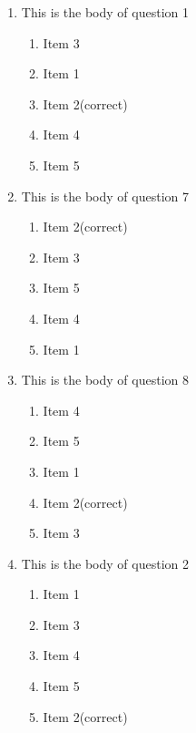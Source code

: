 \documentclass[amsfonts,bezier,leqno,fleqn,12pt,a4paper]{article}
\begin{document}
{\begin{large}
\begin{enumerate}
\begin{enumerate}
\end{enumerate}

\vspace {3.5cm}


\item This is the body of question 1
\vspace {0.3in}
\setcounter{equation}{0}

\begin{enumerate}
\item  Item 3
\item  Item 1
\item  Item 2\hfill {\small (correct)}
\item  Item 4
\item  Item 5

\end{enumerate}
\newpage


\item This is the body of question 7
\vspace {0.3in}
\setcounter{equation}{0}

\begin{enumerate}
\item  Item 2\hfill {\small (correct)}
\item  Item 3
\item  Item 5
\item  Item 4
\item  Item 1

\end{enumerate}

\vspace {3.5cm}


\item This is the body of question 8
\vspace {0.3in}
\setcounter{equation}{0}

\begin{enumerate}
\item  Item 4
\item  Item 5
\item  Item 1
\item  Item 2\hfill {\small (correct)}
\item  Item 3

\end{enumerate}
\newpage


\item This is the body of question 2
\vspace {0.3in}
\setcounter{equation}{0}

\begin{enumerate}
\item  Item 1
\item  Item 3
\item  Item 4
\item  Item 5
\item  Item 2\hfill {\small (correct)}


\end{enumerate}
\end{enumerate}
\end{large}}
\end{document}
